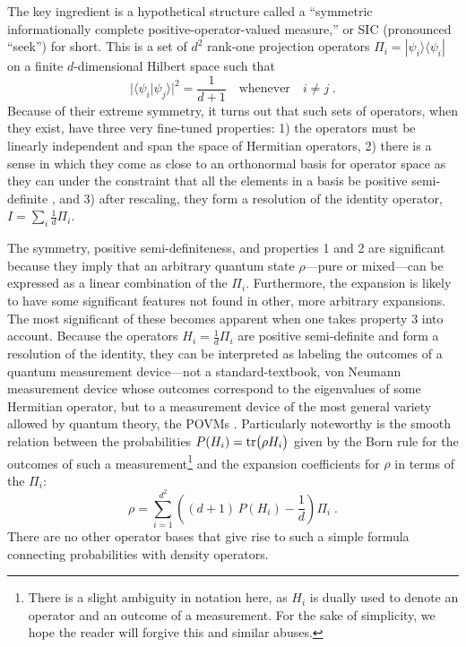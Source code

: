 \documentclass[aps,pra,superscriptaddress,12pt,tightenlines,nofootinbib]{revtex4-2}
\begin{document}
The key ingredient is a hypothetical structure called a ``symmetric informationally complete positive-operator-valued measure,'' or SIC (pronounced ``seek'') for short.  This is a set of $d^2$ rank-one projection operators $\Pi_i=|\psi_i\rangle\langle\psi_i|$ on a finite $d$-dimensional Hilbert space such that
\begin{equation}
\big|\langle\psi_i|\psi_j\rangle\big|^2=\frac{1}{d+1}\quad \mbox{whenever} \quad i\ne j\;.
\label{Mojo}
\end{equation}
Because of their extreme symmetry, it turns out that such sets of operators, when they exist, have three very fine-tuned properties: 1) the operators must be linearly independent and span the space of Hermitian operators, 2) there is a sense in which they come as close to an orthonormal basis for operator space as they can under the constraint that all the elements in a basis be positive semi-definite \cite{Appleby07}, and 3) after rescaling, they form a resolution of the identity operator, $I=\sum_i \frac{1}{d}\Pi_i$.

The symmetry, positive semi-definiteness, and properties 1 and 2 are significant because they imply that an arbitrary quantum state $\rho$---pure or mixed---can be expressed as a linear combination of the $\Pi_i$.  Furthermore, the expansion is likely to have some significant features not found in other, more arbitrary expansions.  The most significant of these becomes apparent when one takes property 3 into account.  Because the operators $H_i=\frac1d \Pi_i$ are positive semi-definite and form a resolution of the identity, they can be interpreted as labeling the outcomes of a quantum measurement device---not a standard-textbook, von Neumann measurement device whose outcomes correspond to the eigenvalues of some Hermitian operator, but to a measurement device of the most general variety allowed by quantum theory, the POVMs \cite{Nielsen00,Peres95}.  Particularly noteworthy is the smooth relation between the probabilities $P(H_i)={\rm tr}\big(\rho H_i\big)$ given by the Born rule for the outcomes of such a measurement\footnote{There is a slight ambiguity in notation here, as $H_i$ is dually used to denote an operator and an outcome of a measurement. For the sake of simplicity, we hope the reader will forgive this and similar abuses.}
and the expansion coefficients for $\rho$ in terms of the $\Pi_i$:
\begin{equation}
\rho = \sum_{i=1}^{d^2}\left( (d+1)\,P(H_i) - \frac1d \right)\Pi_i\;.
\label{Ralph}
\end{equation}
There are no other operator bases that give rise to such a simple formula connecting probabilities with density operators.
\end{document}
